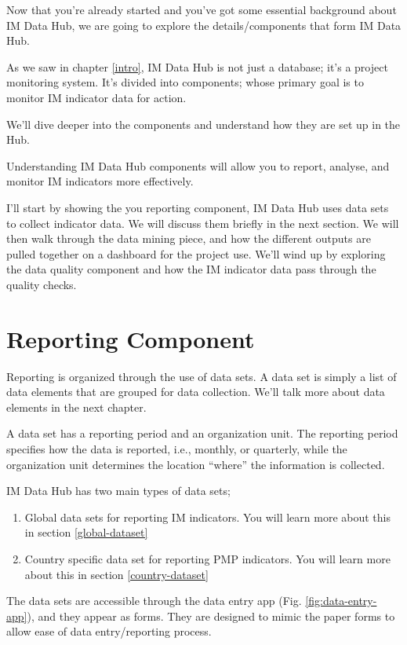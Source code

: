 \documentclass[]{book}
\providecommand{\tightlist}{%
  \setlength{\itemsep}{0pt}\setlength{\parskip}{0pt}}
\begin{document}
Now that you're already started and you've got some essential background about IM Data Hub, we are going to explore the details/components that form IM Data Hub.

As we saw in chapter \ref{intro}, IM Data Hub is not just a database; it's a project monitoring system. It's divided into components; whose primary goal is to monitor IM indicator data for action.

We'll dive deeper into the components and understand how they are set up in the Hub.

Understanding IM Data Hub components will allow you to report, analyse, and monitor IM indicators more effectively.

I'll start by showing the you reporting component, IM Data Hub uses data sets to collect indicator data. We will discuss them briefly in the next section. We will then walk through the data mining piece, and how the different outputs are pulled together on a dashboard for the project use. We'll wind up by exploring the data quality component and how the IM indicator data pass through the quality checks.

\hypertarget{reporting-component}{%
\section{Reporting Component}\label{reporting-component}}

Reporting is organized through the use of data sets. A data set is simply a list of data elements that are grouped for data collection. We'll talk more about data elements in the next chapter.

A data set has a reporting period and an organization unit. The reporting period specifies how the data is reported, i.e., monthly, or quarterly, while the organization unit determines the location ``where'' the information is collected.

IM Data Hub has two main types of data sets;

\begin{enumerate}
\def\labelenumi{\arabic{enumi}.}
\tightlist
\item
  Global data sets for reporting IM indicators. You will learn more about this in section \ref{global-dataset}
\item
  Country specific data set for reporting PMP indicators. You will learn more about this in section \ref{country-dataset}
\end{enumerate}

The data sets are accessible through the data entry app (Fig. \ref{fig:data-entry-app}), and they appear as forms. They are designed to mimic the paper forms to allow ease of data entry/reporting process.
\end{document}
